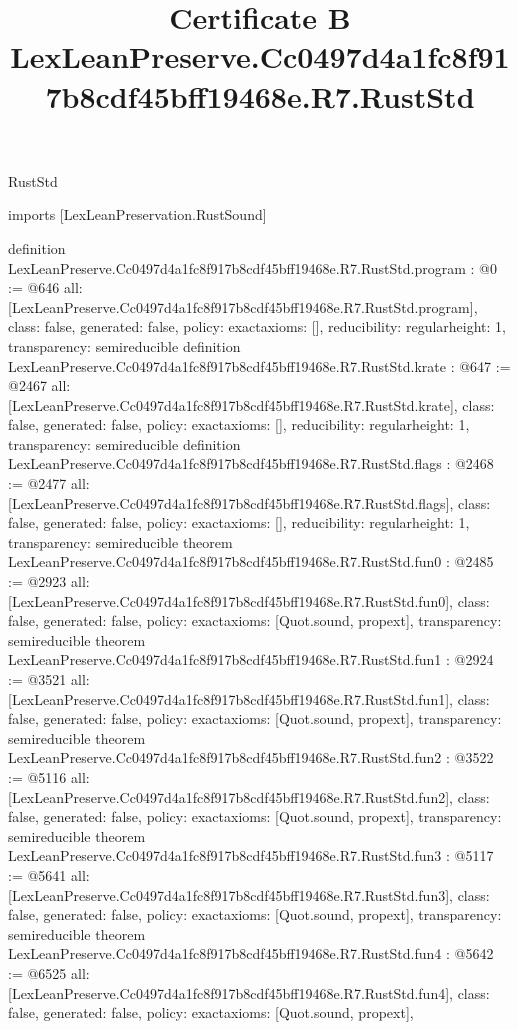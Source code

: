 \begin{lexlean}{RustStd}
\title{Certificate B LexLeanPreserve.Cc0497d4a1fc8f917b8cdf45bff19468e.R7.RustStd}
\begin{coremodule}
imports [LexLeanPreservation.RustSound]

definition LexLeanPreserve.Cc0497d4a1fc8f917b8cdf45bff19468e.R7.RustStd.program : @0 := @646 {
  all: [LexLeanPreserve.Cc0497d4a1fc8f917b8cdf45bff19468e.R7.RustStd.program],
  class: false,
  generated: false,
  policy: exact{axioms: []},
  reducibility: regular{height: 1},
  transparency: semireducible
}
definition LexLeanPreserve.Cc0497d4a1fc8f917b8cdf45bff19468e.R7.RustStd.krate : @647 := @2467 {
  all: [LexLeanPreserve.Cc0497d4a1fc8f917b8cdf45bff19468e.R7.RustStd.krate],
  class: false,
  generated: false,
  policy: exact{axioms: []},
  reducibility: regular{height: 1},
  transparency: semireducible
}
definition LexLeanPreserve.Cc0497d4a1fc8f917b8cdf45bff19468e.R7.RustStd.flags : @2468 := @2477 {
  all: [LexLeanPreserve.Cc0497d4a1fc8f917b8cdf45bff19468e.R7.RustStd.flags],
  class: false,
  generated: false,
  policy: exact{axioms: []},
  reducibility: regular{height: 1},
  transparency: semireducible
}
theorem LexLeanPreserve.Cc0497d4a1fc8f917b8cdf45bff19468e.R7.RustStd.fun0 : @2485 := @2923 {
  all: [LexLeanPreserve.Cc0497d4a1fc8f917b8cdf45bff19468e.R7.RustStd.fun0],
  class: false,
  generated: false,
  policy: exact{axioms: [Quot.sound, propext]},
  transparency: semireducible
}
theorem LexLeanPreserve.Cc0497d4a1fc8f917b8cdf45bff19468e.R7.RustStd.fun1 : @2924 := @3521 {
  all: [LexLeanPreserve.Cc0497d4a1fc8f917b8cdf45bff19468e.R7.RustStd.fun1],
  class: false,
  generated: false,
  policy: exact{axioms: [Quot.sound, propext]},
  transparency: semireducible
}
theorem LexLeanPreserve.Cc0497d4a1fc8f917b8cdf45bff19468e.R7.RustStd.fun2 : @3522 := @5116 {
  all: [LexLeanPreserve.Cc0497d4a1fc8f917b8cdf45bff19468e.R7.RustStd.fun2],
  class: false,
  generated: false,
  policy: exact{axioms: [Quot.sound, propext]},
  transparency: semireducible
}
theorem LexLeanPreserve.Cc0497d4a1fc8f917b8cdf45bff19468e.R7.RustStd.fun3 : @5117 := @5641 {
  all: [LexLeanPreserve.Cc0497d4a1fc8f917b8cdf45bff19468e.R7.RustStd.fun3],
  class: false,
  generated: false,
  policy: exact{axioms: [Quot.sound, propext]},
  transparency: semireducible
}
theorem LexLeanPreserve.Cc0497d4a1fc8f917b8cdf45bff19468e.R7.RustStd.fun4 : @5642 := @6525 {
  all: [LexLeanPreserve.Cc0497d4a1fc8f917b8cdf45bff19468e.R7.RustStd.fun4],
  class: false,
  generated: false,
  policy: exact{axioms: [Quot.sound, propext]},
}
\end{coremodule}
\end{lexlean}
